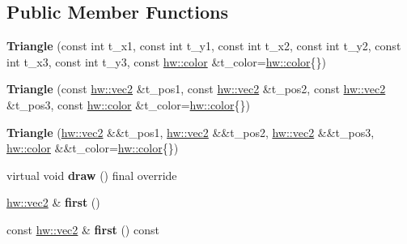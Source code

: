 \subsection*{Public Member Functions}
\begin{DoxyCompactItemize}
\item 
\mbox{\label{classdummy__api_1_1Triangle_aeb0a9e3df5fac770cdd1529a59b39f1e}} 
{\bfseries Triangle} (const int t\+\_\+x1, const int t\+\_\+y1, const int t\+\_\+x2, const int t\+\_\+y2, const int t\+\_\+x3, const int t\+\_\+y3, const \mbox{\hyperlink{structhw_1_1color}{hw\+::color}} \&t\+\_\+color=\mbox{\hyperlink{structhw_1_1color}{hw\+::color}}\{\})
\item 
\mbox{\label{classdummy__api_1_1Triangle_a9ea655faa9f8ace0b0b7ee6b078971ab}} 
{\bfseries Triangle} (const \mbox{\hyperlink{structhw_1_1vec2}{hw\+::vec2}} \&t\+\_\+pos1, const \mbox{\hyperlink{structhw_1_1vec2}{hw\+::vec2}} \&t\+\_\+pos2, const \mbox{\hyperlink{structhw_1_1vec2}{hw\+::vec2}} \&t\+\_\+pos3, const \mbox{\hyperlink{structhw_1_1color}{hw\+::color}} \&t\+\_\+color=\mbox{\hyperlink{structhw_1_1color}{hw\+::color}}\{\})
\item 
\mbox{\label{classdummy__api_1_1Triangle_a120fe6632ab6f41b0b02abac56147eef}} 
{\bfseries Triangle} (\mbox{\hyperlink{structhw_1_1vec2}{hw\+::vec2}} \&\&t\+\_\+pos1, \mbox{\hyperlink{structhw_1_1vec2}{hw\+::vec2}} \&\&t\+\_\+pos2, \mbox{\hyperlink{structhw_1_1vec2}{hw\+::vec2}} \&\&t\+\_\+pos3, \mbox{\hyperlink{structhw_1_1color}{hw\+::color}} \&\&t\+\_\+color=\mbox{\hyperlink{structhw_1_1color}{hw\+::color}}\{\})
\item 
\mbox{\label{classdummy__api_1_1Triangle_a399ad592d62b0febea882027620922d2}} 
virtual void {\bfseries draw} () final override
\item 
\mbox{\label{classdummy__api_1_1Triangle_aca597f07e71b25b012e44f955d341f24}} 
\mbox{\hyperlink{structhw_1_1vec2}{hw\+::vec2}} \& {\bfseries first} ()
\item 
\mbox{\label{classdummy__api_1_1Triangle_a5c0f442492bb74b5df58cb5d4b2282d3}} 
const \mbox{\hyperlink{structhw_1_1vec2}{hw\+::vec2}} \& {\bfseries first} () const

\end{DoxyCompactItemize}
